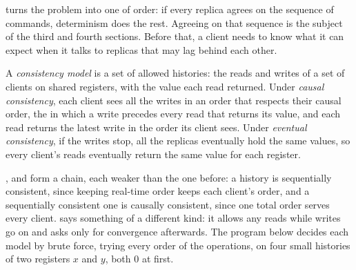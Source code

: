  turns the problem into one of order: if every replica agrees on the sequence of commands, determinism does the rest. Agreeing on that sequence is the subject of the third and fourth sections. Before that, a client needs to know what it can expect when it talks to replicas that may lag behind each other.

\begin{definition}\label{def:b3:replication-and-consensus:consistency}
A \emph{consistency model} is a set of allowed histories: the reads and writes of a set of clients on shared registers, with the value each read returned. Under \emph{causal consistency}, each client sees all the writes in an order that respects their causal order, the  in which a write precedes every read that returns its value, and each read returns the latest write in the order its client sees. Under \emph{eventual consistency}, if the writes stop, all the replicas eventually hold the same values, so every client's reads eventually return the same value for each register.
\end{definition}

,  and  form a chain, each weaker than the one before: a  history is sequentially consistent, since keeping real-time order keeps each client's order, and a sequentially consistent one is causally consistent, since one total order serves every client.  says something of a different kind: it allows any reads while writes go on and asks only for convergence afterwards. The program below decides each model by brute force, trying every order of the operations, on four small histories of two registers $x$ and $y$, both 0 at first.

\label{lst:b3:replication-and-consensus:consistency}

